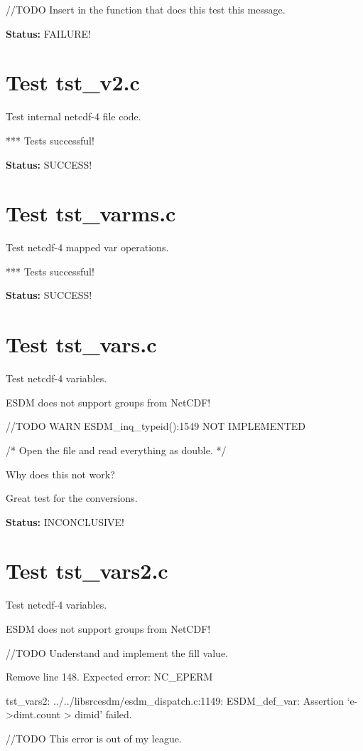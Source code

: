 //TODO Insert in the function that does this test this message.

{\bf \large Status: } FAILURE!

\section{Test tst\_v2.c}

Test internal netcdf-4 file code.

*** Tests successful!

{\bf \large Status: } SUCCESS!

\section{Test tst\_varms.c}

Test netcdf-4 mapped var operations.

*** Tests successful!

{\bf \large Status: } SUCCESS!

\section{Test tst\_vars.c}

Test netcdf-4 variables.

ESDM does not support groups from NetCDF!

//TODO WARN ESDM\_inq\_typeid():1549 NOT IMPLEMENTED

/* Open the file and read everything as double. */

Why does this not work?

Great test for the conversions.

{\bf \large Status: } INCONCLUSIVE!

\section{Test tst\_vars2.c}

Test netcdf-4 variables.

ESDM does not support groups from NetCDF!

//TODO Understand and implement the fill value.

Remove line 148. Expected error: NC\_EPERM

tst\_vars2: ../../libsrcesdm/esdm\_dispatch.c:1149: ESDM\_def\_var: Assertion `e->dimt.count > dimid' failed.

//TODO This error is out of my league.

